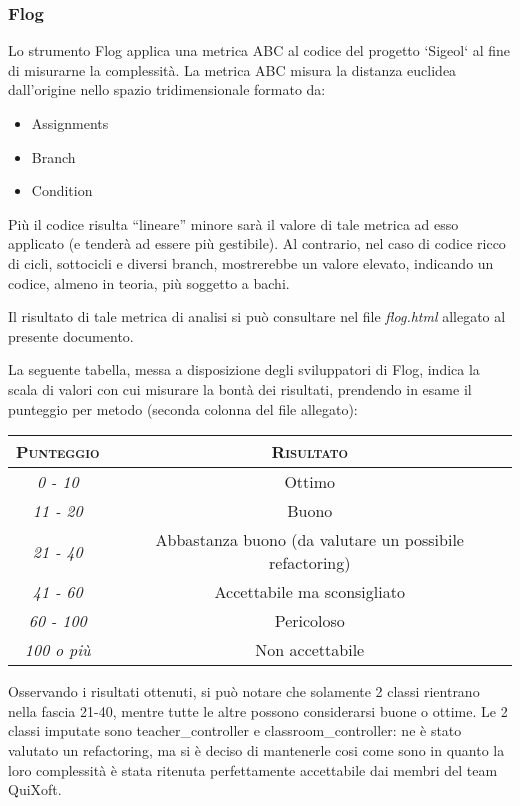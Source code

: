 \documentclass[11pt,a4paper]{article}
\begin{document}
\subsubsection{Flog}
Lo strumento Flog applica una metrica ABC al codice del progetto `Sigeol` al fine di misurarne la complessità.
La metrica ABC misura la distanza euclidea dall’origine nello spazio tridimensionale formato da:
\begin{itemize}
 \item Assignments
 \item Branch
 \item Condition
\end{itemize}
Più il codice risulta “lineare” minore sarà il valore di tale metrica ad esso applicato (e tenderà ad essere più gestibile). Al contrario, nel caso di codice ricco di cicli, sottocicli e diversi branch, mostrerebbe un valore elevato, indicando un codice, almeno in teoria, più soggetto a bachi.

Il risultato di tale metrica di analisi si può consultare nel file \textit{flog.html} allegato al presente documento.

La seguente tabella, messa a disposizione degli sviluppatori di Flog, indica la scala di valori con cui misurare la bontà dei risultati, prendendo in esame il punteggio per metodo (seconda colonna del file allegato):

\begin{center}
\begin{tabular}{|c|c|}
\hline
\textsc{Punteggio} & \textsc{Risultato} \\
\hline
\hline
\textit{0 - 10} & Ottimo  \\
\hline
\textit{11 - 20} & Buono  \\
\hline
\textit{21 - 40} & Abbastanza buono (da valutare un possibile refactoring)  \\
\hline
\textit{41 - 60} & Accettabile ma sconsigliato  \\
\hline
\textit{60 - 100} & Pericoloso  \\
\hline
\textit{100 o più} & Non accettabile  \\
\hline
\end{tabular}
\end{center}
Osservando i risultati ottenuti, si può notare che solamente 2 classi rientrano nella fascia 21-40, mentre tutte le altre possono considerarsi buone o ottime. Le 2 classi imputate sono teacher\_controller e classroom\_controller: ne è stato valutato un refactoring, ma si è deciso di mantenerle cosi come sono in quanto la loro complessità è stata ritenuta perfettamente accettabile dai membri del team QuiXoft.
\end{document}
